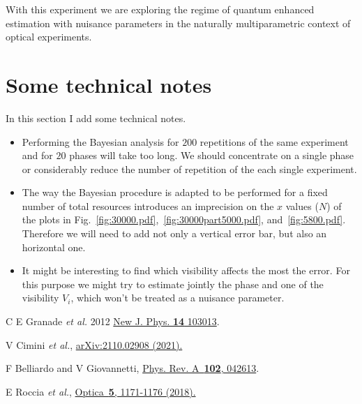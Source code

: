 \documentclass[aps, pra, 10pt, twocolumn, superscriptaddress,floatfix]{revtex4-1}
\begin{document}
With this experiment we are exploring the regime of quantum enhanced estimation with nuisance parameters in the naturally multiparametric context of optical experiments.

\section{Some technical notes}
%
In this section I add some technical notes.
%
\begin{itemize}
	\item Performing the Bayesian analysis for $200$ repetitions of the same experiment and for $20$ phases will take too long. We should concentrate on a single phase or considerably reduce the number of repetition of the each single experiment.
	
	\item The way the Bayesian procedure is adapted to be performed for a fixed number of total resources introduces an imprecision on the $x$ values ($N$) of the plots in Fig.~\ref{fig:30000.pdf},~\ref{fig:30000part5000.pdf}, and~\ref{fig:5800.pdf}. Therefore we will need to add not only a vertical error bar, but also an horizontal one.
	
	\item It might be interesting to find which visibility affects the most the error. For this purpose we might try to estimate jointly the phase and one of the visibility $V_i$, which won't be treated as a nuisance parameter.
	
\end{itemize}

\begin{thebibliography}{100}
	
	 C E Granade \textit{et al.} 2012 \href{https://doi.org/10.1088/1367-2630/14/10/103013}{New J. Phys. {\bf 14} 103013}.
	
	 V Cimini \textit{et al.}, \href{http://arxiv.org/abs/2110.02908}{arXiv:2110.02908 (2021).}
	
	 F Belliardo and V Giovannetti, \href{https://link.aps.org/doi/10.1103/PhysRevA.102.042613}{Phys. Rev. A~{\bf 102}, 042613}.
	
	 E Roccia \textit{et al.}, \href{https://www.osapublishing.org/optica/abstract.cfm?uri=optica-5-10-1171}{Optica~{\bf 5}, 1171-1176 (2018).}
	
\end{thebibliography}
\end{document}
